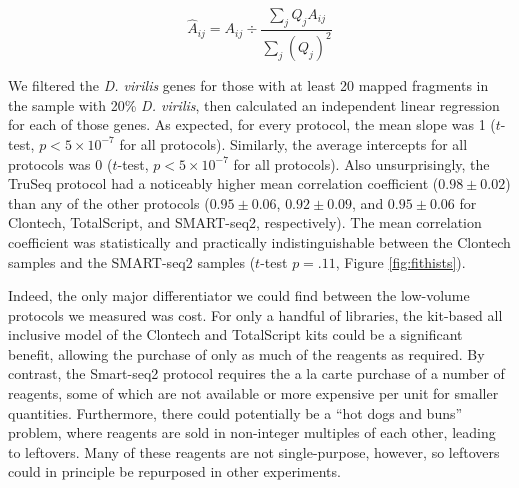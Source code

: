 \begin{equation} \label{eqn:norm}
\hat{A}_{ij} = A_{ij} \div \frac{\sum_j Q_j A_{ij}}{\sum_j (Q_j)^2}  
\end{equation}



We filtered the {\em D. virilis} genes for those with at least 20 mapped fragments in the sample with 20\% {\em D. virilis}, then calculated an independent linear regression for each of those genes.  As expected, for every protocol, the mean slope was 1 ($t$-test, $p<5\times10^{-7}$ for all protocols).  Similarly, the average intercepts for all protocols was 0 ($t$-test, $p<5\times10^{-7}$ for all protocols).  Also unsurprisingly, the TruSeq protocol had a noticeably higher mean correlation coefficient ($0.98 \pm 0.02$) than any of the other protocols ($0.95 \pm 0.06$, $0.92\pm0.09$, and $0.95 \pm 0.06$ for Clontech, TotalScript, and SMART-seq2, respectively). The mean correlation coefficient was statistically and practically indistinguishable between the Clontech samples and the SMART-seq2 samples ($t$-test $p = .11$, Figure \ref{fig:fithists}).

Indeed, the only major differentiator we could find between the low-volume protocols we measured was cost.  For only a handful of libraries, the kit-based all inclusive model of the Clontech and TotalScript kits could be a significant benefit, allowing the purchase of only as much of the reagents as required.  By contrast, the Smart-seq2 protocol requires the a la carte purchase of a number of reagents, some of which are not available or more expensive per unit for smaller quantities. Furthermore, there could potentially be a ``hot dogs and buns'' problem, where reagents are sold in non-integer multiples of each other, leading to leftovers. Many of these reagents are not single-purpose, however, so leftovers could in principle be repurposed in other experiments.
